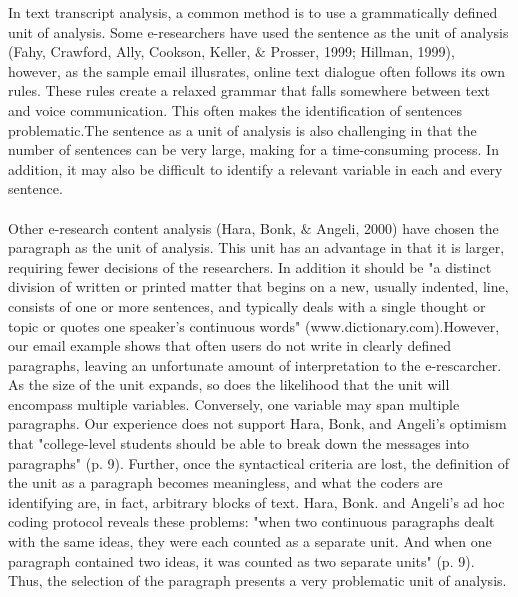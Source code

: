 \noindent In text transcript analysis, a common method is to use a grammatically defined unit of analysis. Some e-researchers have used the sentence as the unit of analysis (Fahy, Crawford, Ally, Cookson, Keller, $\&$ Prosser, 1999; Hillman, 1999), however, as the sample email illusrates, online text dialogue often follows its own rules. These rules create a relaxed grammar that falls somewhere between text and voice communication. This often makes the identification of sentences problematic.The sentence as a unit of analysis is also challenging in that the number of sentences can be very large, making for a time-consuming process. In addition, it may also be difficult to identify a relevant variable in each and every sentence.\\

\\

\noindent Other e-research content analysis (Hara, Bonk, $\&$ Angeli, 2000) have chosen the paragraph as the unit of analysis. This unit has an advantage in that it is larger, requiring fewer decisions of the researchers. In addition it should be "a distinct division of writ­ten or printed matter that begins on a new, usually indented, line, consists of one or more sentences, and typically deals with a single thought or topic or  quotes  one speaker's continuous words" (www.dictionary.com).However, our email example shows that often users do not write in clearly defined paragraphs, leaving an unfortunate amount of interpretation to the e-rescarcher. As the size of the unit expands, so does the likelihood that the unit will encompass multiple variables. Conversely, one variable may span multiple paragraphs. Our experience does not support Hara, Bonk, and Angeli's optimism that "college-level students should be able to break down the mes­sages into paragraphs" (p. 9). Further, once the syntactical criteria are lost, the defini­tion of the unit as a paragraph becomes meaningless, and what the coders are identifying are, in fact, arbitrary blocks of  text. Hara, Bonk. and Angeli's ad hoc cod­ing protocol reveals these problems: "when two continuous paragraphs dealt with the same ideas, they were each counted as a separate unit. And when one paragraph contained two ideas, it was counted as two separate units" (p. 9). Thus, the selection of the paragraph presents a very problematic unit of analysis.\\

